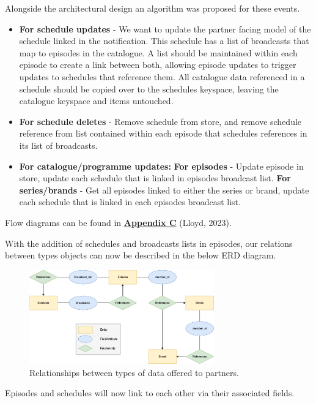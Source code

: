     Alongside the architectural design an algorithm was proposed for these events.
    \begin{itemize}
      \item \textbf{For schedule updates} - We want to update the partner facing model of the schedule linked in the notification. This schedule has a 
      list of broadcasts that map to episodes in the catalogue. A list should be maintained within each episode to create a link between both, allowing episode 
      updates to trigger updates to schedules that reference them. All catalogue data referenced in a schedule should be copied over to the schedules keyspace,
      leaving the catalogue keyspace and items untouched.
      \item \textbf{For schedule deletes} - Remove schedule from store, and remove schedule reference from list contained within each episode that schedules 
      references in its list of broadcasts.
      \item \textbf{For catalogue/programme updates:}
        \subitem \textbf{For episodes} - Update episode in store, update each schedule that is linked in episodes broadcast list.
        \subitem \textbf{For series/brands} - Get all episodes linked to either the series or brand, update each schedule that is linked in each episodes 
        broadcast list.
    \end{itemize}

    Flow diagrams can be found in \hyperref[sec:AppendixC]{\textbf{Appendix C}} (Lloyd, 2023).

    With the addition of schedules and broadcasts lists in episodes, our relations between types objects can now be described in the below ERD diagram.

    \begin{figure}[H]
      \centering
      \includegraphics[width=8cm]{assets/dataERD.drawio.png}
      \caption{Relationships between types of data offered to partners.}
      \label{fig:relationshipsERD}
    \end{figure}

    Episodes and schedules will now link to each other via their associated fields.

\newpage
